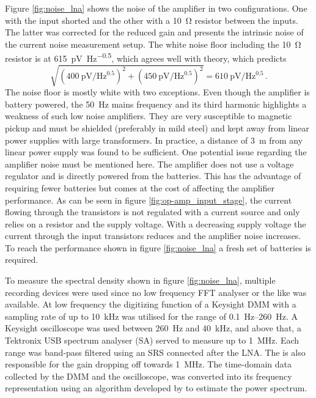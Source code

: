 Figure \ref{fig:noise_lna} shows the noise of the amplifier in two configurations. One with the input shorted and the other with a \qty{10}{\ohm} resistor between the inputs. The latter was corrected for the reduced gain and presents the intrinsic noise of the current noise measurement setup. The white noise floor including the \qty{10}{\ohm} resistor is at \qty{615}{\pV \per \Hz\tothe{0.5}}, which agrees well with theory, which predicts
\begin{equation*}
    \sqrt{\left(\qty{400}{\pV \per \Hz\tothe{0.5}}\right)^2 + \left(\qty{450}{\pV \per \Hz\tothe{0.5}}\right)^2} = \qty{610}{\pV \per \Hz\tothe{0.5}}\,.
\end{equation*}
The noise floor is mostly white with two exceptions. Even though the amplifier is battery powered, the \qty{50}{\Hz} mains frequency and its third harmonic highlights a weakness of such low noise amplifiers. They are very susceptible to magnetic pickup and must be shielded (preferably in mild steel) and kept away from linear power supplies with large transformers. In practice, a distance of \qty{3}{\m} from any linear power supply was found to be sufficient. One potential issue regarding the amplifier noise must be mentioned here. The amplifier does not use a voltage regulator and is directly powered from the batteries. This has the advantage of requiring fewer batteries but comes at the cost of affecting the amplifier performance. As can be seen in figure \ref{fig:op-amp_input_stage}, the current flowing through the transistors is not regulated with a current source and only relies on a resistor and the supply voltage. With a decreasing supply voltage the current through the input transistors reduces and the amplifier noise increases. To reach the performance shown in figure \ref{fig:noise_lna} a fresh set of batteries is required.

To measure the spectral density shown in figure \ref{fig:noise_lna}, multiple recording devices were used since no low frequency FFT analyser or the like was available. At low frequency the digitizing function of a Keysight  DMM with a sampling rate of up to \qty{10}{\kHz} was utilised for the range of \qtyrange[range-phrase={~to~}]{0.1}{260}{\Hz}. A Keysight  oscilloscope was used between \qty{260}{\Hz} and \qty{40}{\kHz}, and above that, a Tektronix  USB spectrum analyser (SA) served to measure up to \qty{1}{\MHz}. Each range was band-pass filtered using an SRS  connected after the LNA. The  is also responsible for the gain dropping off towards \qty{1}{\MHz}. The time-domain data collected by the DMM and the oscilloscope, was converted into its frequency representation using an algorithm developed by \citeauthor{welch} \cite{welch} to estimate the power spectrum.

